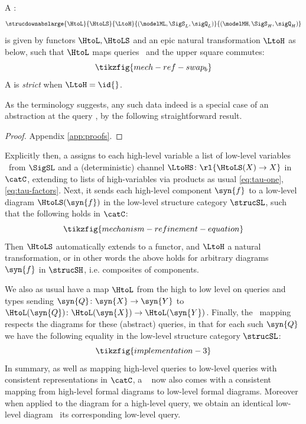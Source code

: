 \documentclass{article}
\begin{document}
\begin{definition}[\strucdowncaps]  \label{def:complevel}
A \emph{\strucdownfull}: 
\[
\strucdownabslarge{\HtoL}{\HtoLS}{\LtoH}{(\modelML,\SigS_L,\sigQ_L)}{(\modelMH,\SigS_H,\sigQ_H)}
\]
is given by functors $\HtoL, \HtoLS$ 
and an epic natural transformation $\LtoH$ as below, such that $\HtoL$ maps queries \ and the upper square commutes:
\begin{equation} \label{eq:structure-comm-square}
\tikzfig{mech-ref-swap_b}
\end{equation}
A \strucdown{} is \emph{strict} when $\LtoH=\id{}$. 
\end{definition}

As the terminology suggests, any such data indeed is a special case of an abstraction at the query , by the following straightforward result.

\begin{proof} Appendix \ref{app:proofs}. \end{proof} 

Explicitly then, a \strucdown{} assigns to each high-level variable  a list of low-level variables \ from $\SigSL$ and a (deterministic) channel $\LtoHS \colon \rl{\HtoLS(X) \to X}$ in $\catC$, extending to lists of high-variables via products as usual \eqref{eq:tau-one}, \eqref{eq:tau-factors}. Next, it sends each high-level component $\syn{f}$ to a low-level diagram $\HtoLS(\syn{f})$ in the low-level structure category $\strucSL$, such that the following holds in $\catC$: 
\[
\tikzfig{mechanism-refinement-equation}
\]
Then $\HtoLS$ automatically extends to a functor, and $\LtoH$ a natural transformation, or in other words the above holds for arbitrary diagrams $\syn{f}$ in $\strucSH$, i.e. composites of components.

We also as usual have a map $\HtoL$ from the high to low level on queries and types sending $\syn{Q} \colon \syn{X} \to \syn{Y}$ to $\HtoL(\syn{Q}) \colon \HtoL(\syn{X}) \to \HtoL(\syn{Y})$. 
Finally, the \ mapping respects the diagrams for these (abstract) queries, in that for each such $\syn{Q}$ we have the following equality in the low-level structure category $\strucSL$: 
\[
\tikzfig{implementation-3}
\]
In summary, as well as mapping high-level queries to low-level queries with consistent representations in $\catC$, a \strucdownfull~ now also comes with a consistent mapping from high-level formal diagrams to low-level formal diagrams. Moreover when applied to the diagram for a high-level query, we obtain an identical low-level diagram \ its corresponding low-level query.
\end{document}

